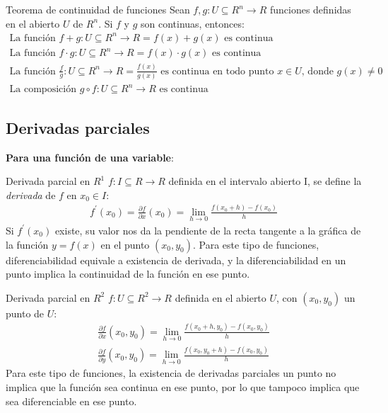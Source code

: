 \documentclass[a4paper, twoside]{article}
\numberwithin{equation}{section}
\numberwithin{figure}{section}
\numberwithin{table}{section}
\begin{document}
\begin{teorema*}{Teorema de continuidad de funciones}
	Sean $f, g: U \subseteq R^n \rightarrow R$ funciones definidas en el abierto $U$ de $R^n$. Si $f$ y $g$ son continuas, entonces:
	\begin{align}
		\text{La función } f+g:U\subseteq R^n \rightarrow R=f\left(x\right)+g(x) \text{ es continua} \\
		\text{La función } f\cdot g:U\subseteq R^n \rightarrow R=f\left(x\right)\cdot g(x) \text{ es continua} \\
		\text{La función } \frac{f}{g}:U\subseteq R^n \rightarrow R=\frac{f\left(x\right)}{g\left(x\right)} \text{ es continua en todo punto } x\in U \text{, donde } g(x)\neq0 \\
		\text{La composición } g\circ f:U\subseteq R^n \rightarrow R \text{ es continua}
	\end{align}
\end{teorema*}

\subsection{Derivadas parciales}
\textbf{Para una función de una variable}: 

\begin{definicion*}{Derivada parcial en $R^1$}
	$f: I \subseteq R \rightarrow R$ definida en el intervalo abierto I, se define la \textit{derivada} de $f$ en $x_0 \in I$:
	\begin{align}
		f^\prime(x_0) = \frac{\partial f}{\partial x}(x_0) = \lim_{h \to 0}\frac{f(x_0+h) - f(x_0)}{h}
	\end{align}
	Si $f^\prime (x_0)$ existe, su valor nos da la pendiente de la recta tangente a la gráfica de la función $y=f(x)$ en el punto $(x_0,y_0)$.
	Para este tipo de funciones, diferenciabilidad equivale a existencia de derivada, y la diferenciabilidad en un punto implica la continuidad de la función en ese punto.
\end{definicion*}

\begin{definicion*}{Derivada parcial en $R^2$}
	$f: U \subseteq R^2 \rightarrow R$ definida en el abierto $U$, con $(x_0, y_0)$ un punto de $U$:
	\begin{align}
		\frac{\partial f}{\partial x}(x_0, y_0) = \lim_{h \to 0}\frac{f(x_0+h, y_0) - f(x_0, y_0)}{h} \\
		\frac{\partial f}{\partial y}(x_0, y_0) = \lim_{h \to 0}\frac{f\left( x_0, y_0 + h \right) - f(x_0, y_0)}{h}
	\end{align}
	Para este tipo de funciones, la existencia de derivadas parciales un punto no implica que la función sea continua en ese punto, por lo que tampoco implica que sea diferenciable en ese punto.
\end{definicion*}
\end{document}
